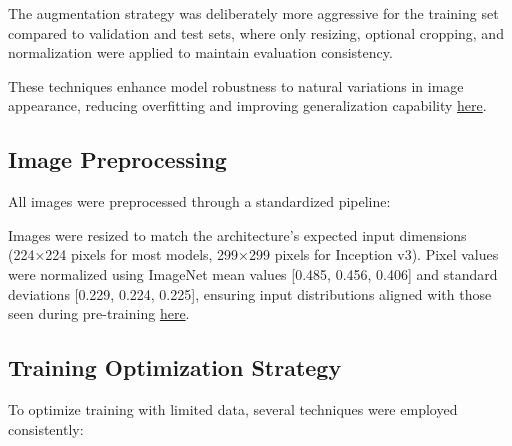 \documentclass[a4paper,12pt]{report}
\begin{document}
The augmentation strategy was deliberately more aggressive for the training set compared to validation and test sets, where only resizing, optional cropping, and normalization were applied to maintain evaluation consistency.

These techniques enhance model robustness to natural variations in image appearance, reducing overfitting and improving generalization capability \href{https://arxiv.org/abs/1712.04621}{here}.

\subsection{Image Preprocessing}

All images were preprocessed through a standardized pipeline:

Images were resized to match the architecture's expected input dimensions (224×224 pixels for most models, 299×299 pixels for Inception v3). Pixel values were normalized using ImageNet mean values [0.485, 0.456, 0.406] and standard deviations [0.229, 0.224, 0.225], ensuring input distributions aligned with those seen during pre-training \href{https://openaccess.thecvf.com/content_cvpr_2016/papers/He_Deep_Residual_Learning_CVPR_2016_paper.pdf}{here}.

\subsection{Training Optimization Strategy} 

To optimize training with limited data, several techniques were employed consistently:
\end{document}
